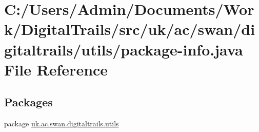 \hypertarget{utils_2package-info_8java}{\section{C\+:/\+Users/\+Admin/\+Documents/\+Work/\+Digital\+Trails/src/uk/ac/swan/digitaltrails/utils/package-\/info.java File Reference}
\label{utils_2package-info_8java}
}
\subsection*{Packages}
\begin{DoxyCompactItemize}
\item 
package \hyperlink{namespaceuk_1_1ac_1_1swan_1_1digitaltrails_1_1utils}{uk.\+ac.\+swan.\+digitaltrails.\+utils}
\end{DoxyCompactItemize}
